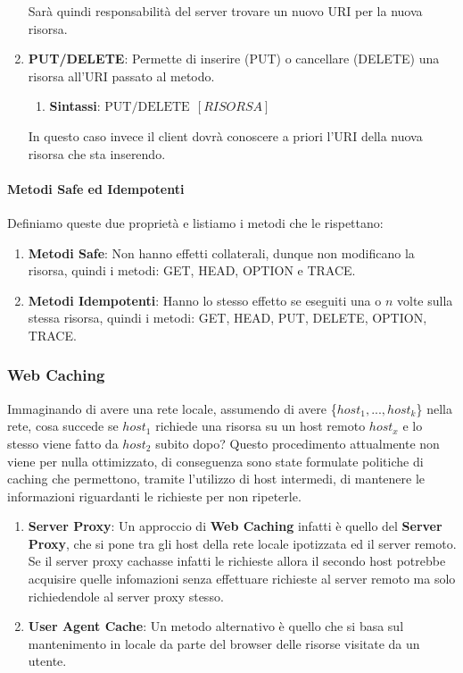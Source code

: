 \documentclass{article}
\begin{document}
\begin{enumerate}
\begin{figure}[htbp]
    \end{figure}
    Sarà quindi responsabilità del server trovare un nuovo URI per la nuova risorsa.
    \newpage
    \item \textbf{PUT/DELETE}: Permette di inserire (PUT) o cancellare (DELETE) una risorsa all'URI passato al metodo.
    \begin{enumerate}
        \item \textbf{Sintassi}: $\boxed{\text{PUT/DELETE} \:\: [RISORSA]}$
    \end{enumerate}
    In questo caso invece il client dovrà conoscere a priori l'URI della nuova risorsa che sta inserendo.
\end{enumerate}

\paragraph{Metodi Safe ed Idempotenti} Definiamo queste due proprietà e listiamo i metodi che le rispettano:

\begin{enumerate}
    \item \textbf{Metodi Safe}: Non hanno effetti collaterali, dunque non modificano la risorsa, quindi i metodi: GET, HEAD, OPTION e TRACE.
    \item \textbf{Metodi Idempotenti}: Hanno lo stesso effetto se eseguiti una o $n$ volte sulla stessa risorsa, quindi i metodi: GET, HEAD, PUT, DELETE, OPTION, TRACE. 
\end{enumerate}

\subsubsection{Web Caching}

Immaginando di avere una rete locale, assumendo di avere \{$host_1, ... , host_k$\} nella rete, cosa succede se $host_1$ richiede una risorsa
su un host remoto $host_x$ e lo stesso viene fatto da $host_2$ subito dopo? Questo procedimento attualmente non viene per nulla ottimizzato, di conseguenza
sono state formulate politiche di caching che permettono, tramite l'utilizzo di host intermedi, di mantenere le informazioni riguardanti le richieste per non ripeterle.

\begin{enumerate}
    \item \textbf{Server Proxy}: Un approccio di \textbf{Web Caching} infatti è quello del \textbf{Server Proxy}, che si pone tra gli host della rete locale ipotizzata ed il server remoto. Se il server proxy cachasse infatti le richieste
    allora il secondo host potrebbe acquisire quelle infomazioni senza effettuare richieste al server remoto ma solo richiedendole al server proxy stesso.
    \item \textbf{User Agent Cache}: Un metodo alternativo è quello che si basa sul mantenimento in locale da parte del browser delle risorse visitate da un utente.
\end{enumerate}
\end{document}
